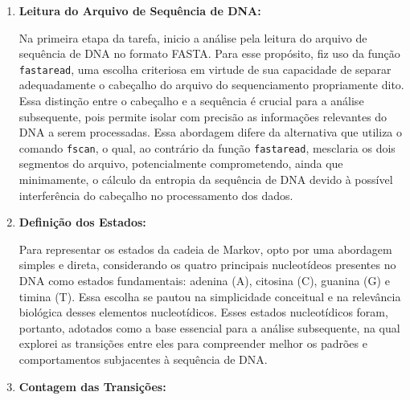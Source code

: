 \documentclass{article}
\begin{document}
\begin{enumerate}
    \item \textbf{Leitura do Arquivo de Sequência de DNA:} 
    
    Na primeira etapa da tarefa, inicio a análise pela leitura do arquivo de sequência de DNA no formato FASTA. Para esse propósito, fiz uso da função \texttt{fastaread}, uma escolha criteriosa em virtude de sua capacidade de separar adequadamente o cabeçalho do arquivo do sequenciamento propriamente dito. Essa distinção entre o cabeçalho e a sequência é crucial para a análise subsequente, pois permite isolar com precisão as informações relevantes do DNA a serem processadas. Essa abordagem difere da alternativa que utiliza o comando \texttt{fscan}, o qual, ao contrário da função \texttt{fastaread}, mesclaria os dois segmentos do arquivo, potencialmente comprometendo, ainda que minimamente, o cálculo da entropia da sequência de DNA devido à possível interferência do cabeçalho no processamento dos dados.

    \item \textbf{Definição dos Estados:} 
    
    Para representar os estados da cadeia de Markov, opto por uma abordagem simples e direta, considerando os quatro principais nucleotídeos presentes no DNA como estados fundamentais: adenina (A), citosina (C), guanina (G) e timina (T). Essa escolha se pautou na simplicidade conceitual e na relevância biológica desses elementos nucleotídicos. Esses estados nucleotídicos foram, portanto, adotados como a base essencial para a análise subsequente, na qual explorei as transições entre eles para compreender melhor os padrões e comportamentos subjacentes à sequência de DNA.


    \item \textbf{Contagem das Transições:} 
    

\end{enumerate}
\end{document}
